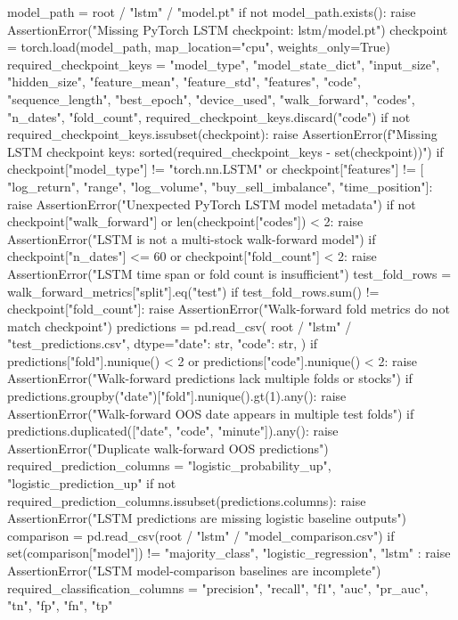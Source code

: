 \documentclass[UTF8,a4paper,fontset=fandol]{ctexart}
\begin{document}
\begin{ProjectCode}
    model_path = root / "lstm" / "model.pt"
    if not model_path.exists():
        raise AssertionError("Missing PyTorch LSTM checkpoint: lstm/model.pt")
    checkpoint = torch.load(model_path, map_location="cpu", weights_only=True)
    required_checkpoint_keys = {
        "model_type", "model_state_dict", "input_size", "hidden_size",
        "feature_mean", "feature_std", "features", "code", "sequence_length",
        "best_epoch", "device_used", "walk_forward", "codes", "n_dates",
        "fold_count",
    }
    required_checkpoint_keys.discard("code")
    if not required_checkpoint_keys.issubset(checkpoint):
        raise AssertionError(f"Missing LSTM checkpoint keys: {sorted(required_checkpoint_keys - set(checkpoint))}")
    if checkpoint["model_type"] != "torch.nn.LSTM" or checkpoint["features"] != [
            "log_return", "range", "log_volume", "buy_sell_imbalance", "time_position"]:
        raise AssertionError("Unexpected PyTorch LSTM model metadata")
    if not checkpoint["walk_forward"] or len(checkpoint["codes"]) < 2:
        raise AssertionError("LSTM is not a multi-stock walk-forward model")
    if checkpoint["n_dates"] <= 60 or checkpoint["fold_count"] < 2:
        raise AssertionError("LSTM time span or fold count is insufficient")
    test_fold_rows = walk_forward_metrics["split"].eq("test")
    if test_fold_rows.sum() != checkpoint["fold_count"]:
        raise AssertionError("Walk-forward fold metrics do not match checkpoint")
    predictions = pd.read_csv(
        root / "lstm" / "test_predictions.csv",
        dtype={"date": str, "code": str},
    )
    if predictions["fold"].nunique() < 2 or predictions["code"].nunique() < 2:
        raise AssertionError("Walk-forward predictions lack multiple folds or stocks")
    if predictions.groupby("date")["fold"].nunique().gt(1).any():
        raise AssertionError("Walk-forward OOS date appears in multiple test folds")
    if predictions.duplicated(["date", "code", "minute"]).any():
        raise AssertionError("Duplicate walk-forward OOS predictions")
    required_prediction_columns = {
        "logistic_probability_up", "logistic_prediction_up"
    }
    if not required_prediction_columns.issubset(predictions.columns):
        raise AssertionError("LSTM predictions are missing logistic baseline outputs")
    comparison = pd.read_csv(root / "lstm" / "model_comparison.csv")
    if set(comparison["model"]) != {
        "majority_class", "logistic_regression", "lstm"
    }:
        raise AssertionError("LSTM model-comparison baselines are incomplete")
    required_classification_columns = {
        "precision", "recall", "f1", "auc", "pr_auc", "tn", "fp", "fn", "tp"
}
\end{ProjectCode}
\end{document}
